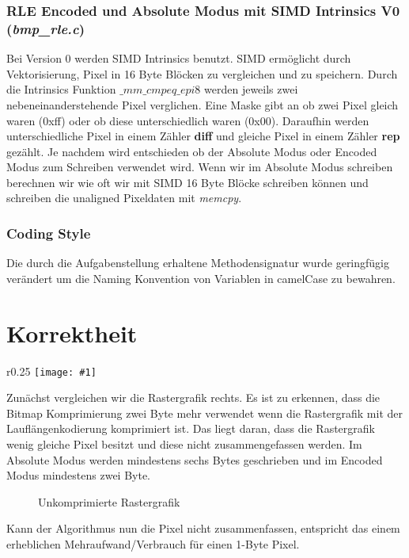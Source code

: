 \documentclass[course=erap]{aspdoc}
\newcommand{\hexdump}[2]{
 \begin{figure}[H]
   \small
   
   \vspace*{-5mm}
   \caption{#2}
 \end{figure}
}
\newcommand{\imagewrap}[5]{
 \begin{wrapfigure}{#3}{#5}
  \vspace*{-5mm}
    \centering
   \texttt{[image: \#1]}
   \caption{#2}
 \end{wrapfigure}
}
\begin{document}
\subsubsection{RLE Encoded und Absolute Modus mit SIMD Intrinsics V0 (\textit{bmp\_rle.c})}
Bei Version 0 werden SIMD Intrinsics benutzt. SIMD ermöglicht durch Vektorisierung, Pixel in 16 Byte Blöcken zu vergleichen und zu speichern. Durch die Intrinsics Funktion $\_mm\_cmpeq\_epi8$ werden jeweils zwei nebeneinanderstehende Pixel verglichen. Eine Maske gibt an ob zwei Pixel gleich waren (0xff) oder ob diese unterschiedlich waren (0x00). Daraufhin werden unterschiedliche Pixel in einem Zähler \textbf{diff} und gleiche Pixel in einem Zähler \textbf{rep} gezählt. Je nachdem wird entschieden ob der Absolute Modus oder Encoded Modus zum Schreiben verwendet wird. Wenn wir im Absolute Modus schreiben berechnen wir wie oft wir mit SIMD 16 Byte Blöcke schreiben können und schreiben die unaligned Pixeldaten mit \textit{memcpy}.


\subsubsection{Coding Style}
Die durch die Aufgabenstellung erhaltene Methodensignatur wurde geringfügig verändert um die Naming Konvention von Variablen in camelCase zu bewahren.

\section{Korrektheit}
\imagewrap{example.png}{Rastergrafik 5x5}{r}{0.17\textwidth}{0.25\textwidth}
\vspace*{2mm}
Zunächst vergleichen wir die Rastergrafik rechts. Es ist zu erkennen, dass die Bitmap Komprimierung zwei Byte mehr verwendet wenn die Rastergrafik mit der Lauflängenkodierung komprimiert ist. Das liegt daran, dass die Rastergrafik wenig gleiche Pixel besitzt und diese nicht zusammengefassen werden. Im Absolute Modus werden mindestens sechs Bytes geschrieben und im Encoded Modus mindestens zwei Byte. 


\hexdump{res/example_28_5x5.txt}{Unkomprimierte Rastergrafik}
Kann der Algorithmus nun die Pixel nicht zusammenfassen, entspricht das einem erheblichen Mehraufwand/Verbrauch für einen 1-Byte Pixel.\newline
\end{document}
